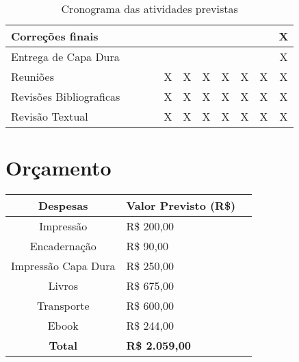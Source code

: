 \begin{table}[!htpb]
\begin{small}
\begin{tabular}{|l|c|c|c|c|c|c|c|c|c|c|}
Correções finais & &  &  &  &  &  &  &  &  & X \\ \hline

Entrega de Capa Dura & &  &  &  &  &  &  &  &  & X \\ \hline

Reuniões & &  &  & X & X & X & X & X & X & X \\ \hline

Revisões Bibliograficas & &  &  & X & X & X & X & X & X & X \\ \hline

Revisão Textual & &  &  & X & X & X & X & X & X & X \\ \hline


\end{tabular} 
\end{small}
\caption{Cronograma das atividades previstas}
\label{t_cronograma}
\end{table} 


\section{Orçamento}




\begin{small}
\begin{tabular}{clr}
\hline
 Despesas & Valor Previsto (R\$)   \\
\hline
 	Impressão & R\$ 200,00  \\
 	Encadernação & R\$ 90,00  \\
 	Impressão Capa Dura  & R\$ 250,00  \\
 	Livros  & R\$ 675,00  \\ 
 	Transporte & R\$ 600,00 \\
 	Ebook  & R\$ 244,00  \\ \hline
 	\textbf{Total} & \textbf{R\$ 2.059,00} \\
\hline
\end{tabular}


\end{small}






